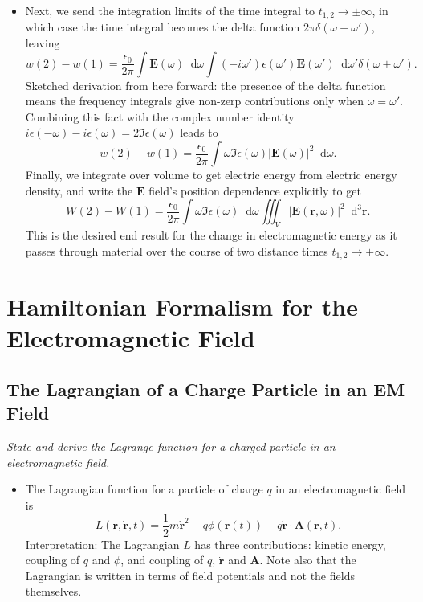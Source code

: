 \documentclass[11pt, a4paper]{article}
\newcommand{\diff}{\mathop{}\!\mathrm{d}} %
\newcommand{\dr}{\diff^{3} \r}  %
\renewcommand{\vec}[1]{\bm{#1}} %
\renewcommand{\r}{\vec{r}}
\newcommand{\E}{\vec{E}} %
\newcommand{\A}{\vec{A}} %
\newcommand{\ee}{\epsilon_{0}}  %
\begin{document}
\begin{itemize}
    \item Next, we send the integration limits of the time integral to $ t_{1, 2} \to \pm \infty $, in which case the time integral becomes the delta function $ 2\pi \delta(\omega + \omega') $, leaving
    \begin{equation*}
        w(2) - w(1) = \frac{\ee}{2\pi} \int \E(\omega) \diff \omega \int  (-i\omega')\epsilon(\omega')\E(\omega') \diff \omega' \delta(\omega + \omega').
    \end{equation*}
    Sketched derivation from here forward: the presence of the delta function means the frequency integrals give non-zerp contributions only when $ \omega = \omega' $. Combining this fact with the complex number identity $ i\epsilon(-\omega) - i \epsilon(\omega) = 2\Im \epsilon(\omega)$ leads to
    \begin{equation*}
        w(2) - w(1) = \frac{\ee}{2\pi} \int \omega \Im \epsilon(\omega) \big |\E(\omega)\big |^{2}  \diff \omega.
    \end{equation*}
    Finally, we integrate over volume to get electric energy from electric energy density, and write the $ \E $ field's position dependence explicitly to get
    \begin{equation*}
        W(2) - W(1) = \frac{\ee}{2\pi} \int \omega \Im \epsilon(\omega) \diff \omega \iiint_{V} \big |\E(\r, \omega)\big |^{2} \dr.
    \end{equation*}
    This is the desired end result for the change in electromagnetic energy as it passes through material over the course of two distance times $ t_{1,2} \to \pm \infty $.

\end{itemize}
    


\newpage
\section{Hamiltonian Formalism for the Electromagnetic Field}

\subsection{The Lagrangian of a Charge Particle in an EM Field} \label{ss:lagrangian}
\textit{State and derive the Lagrange function for a charged particle in an electromagnetic field.}

\begin{itemize}
    \item The Lagrangian function for a particle of charge $ q $ in an electromagnetic field is
    \begin{equation*}
        L(\r, \dot{\vec{r}}, t) = \frac{1}{2}m \dot{\vec{r}}^{2} - q \phi(\r(t)) + q \dot{\vec{r}} \cdot \A(\r, t).
    \end{equation*}
    Interpretation: The Lagrangian $ L $ has three contributions: kinetic energy, coupling of $ q $ and $ \phi $, and coupling of $ q $, $ \dot{\vec{r}} $ and $ \A $. Note also that the Lagrangian is written in terms of field potentials and not the fields themselves.
    
\end{itemize}
\end{document}
